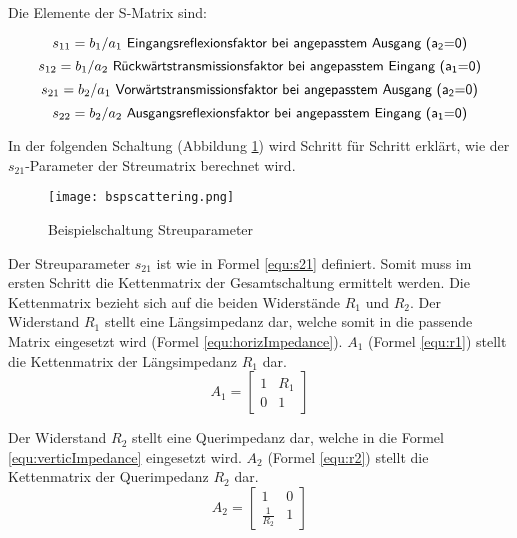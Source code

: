 Die Elemente der S-Matrix sind:

\begin{equation}\label{equ:def_s11}
	s_{11} = b_1/a_1\textsf{ Eingangsreflexionsfaktor bei angepasstem Ausgang (a\textsubscript{2}=0)}
\end{equation}
\begin{equation}\label{equ:def_s12}
	s_{12} = b_1/a_2\textsf{ Rückwärtstransmissionsfaktor bei angepasstem Eingang (a\textsubscript{1}=0)}
\end{equation}
\begin{equation}\label{equ:def_s21}
	s_{21} = b_2/a_1\textsf{ Vorwärtstransmissionsfaktor bei angepasstem Ausgang (a\textsubscript{2}=0)}
\end{equation}
\begin{equation}\label{equ:def_s22}
	s_{22} = b_2/a_2\textsf{ Ausgangsreflexionsfaktor bei angepasstem Eingang (a\textsubscript{1}=0)}
\end{equation}

In der folgenden Schaltung (Abbildung \ref{fig:bspscattering}) wird Schritt für Schritt erklärt, wie der $s_{21}$-Parameter der Streumatrix berechnet wird.
 
\begin{figure}[H]
	\centering
	\texttt{[image: bspscattering.png]}
	\caption{Beispielschaltung Streuparameter}
	\label{fig:bspscattering}
\end{figure}

Der Streuparameter $s_{21}$ ist wie in Formel \ref{equ:s21} definiert. Somit muss im ersten Schritt die Kettenmatrix der Gesamtschaltung ermittelt werden. Die Kettenmatrix bezieht sich auf die beiden Widerstände $R_1$ und $R_2$. Der Widerstand $R_1$ stellt eine Längsimpedanz dar, welche somit in die passende Matrix eingesetzt wird (Formel \ref{equ:horizImpedance}). $A_1$ (Formel \ref{equ:r1}) stellt die Kettenmatrix der Längsimpedanz $R_1$ dar.
\begin{equation}\label{equ:r1}
	A_1 = \left[\begin{matrix}
			1&R_1\\0&1
			\end{matrix}\right]
\end{equation}

Der Widerstand $R_2$ stellt eine Querimpedanz dar, welche in die Formel \ref{equ:verticImpedance} eingesetzt wird. $A_2$ (Formel \ref{equ:r2}) stellt die Kettenmatrix der Querimpedanz $R_2$ dar.
\begin{equation}\label{equ:r2}
			A_2 = \left[\begin{matrix}
			1&0\\\frac{1}{R_2}&1
			\end{matrix}\right]
\end{equation}

